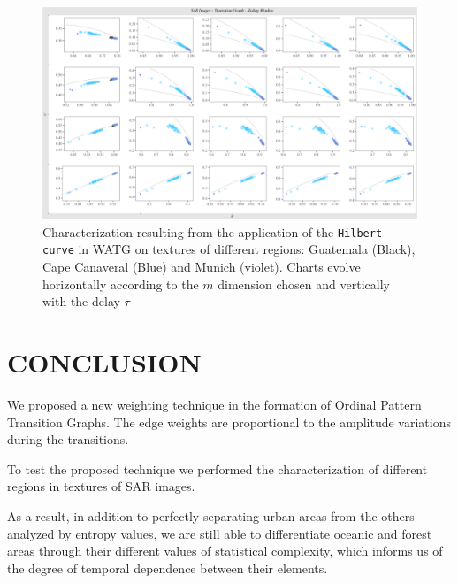 \documentclass{isprs}
\begin{document}
\begin{figure}
	\centering
	\includegraphics[width=1.05\textwidth]{Figures/transitionGraphHilbert.pdf}
	\caption{Characterization resulting from the application of the \texttt{Hilbert curve} in WATG on textures of different regions: Guatemala (Black), Cape Canaveral (Blue) and Munich (violet). Charts evolve horizontally according to the $m$ dimension chosen and vertically with the delay $\tau$}
	\label{fig:Regions}
\end{figure}


\section{CONCLUSION}\label{Conclusion}

We proposed a new weighting technique in the formation of Ordinal Pattern Transition Graphs.
The edge weights are proportional to the amplitude variations during the transitions.

To test the proposed technique we performed the characterization of different regions in textures of SAR images.

As a result, in addition to perfectly separating urban areas from the others analyzed by entropy values, we are still able to differentiate oceanic and forest areas through their different values of statistical complexity, which informs us of the degree of temporal dependence between their elements.
\end{document}
